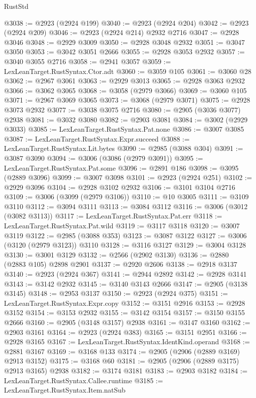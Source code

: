 \begin{lexlean}{RustStd}
\begin{coremodule}
{\begin{coremodule}
{{{{{{{{{{{{{{{{{{{{{{{{{{{{{{{{{{{{{{{{{{{{{{{{{{{{{{{{{{{{{{{{{{{{{{{{{{{{{{@3038 := @2923 (@2924 @199)
@3040 := @2923 (@2924 @204)
@3042 := @2923 (@2924 @209)
@3046 := @2923 (@2924 @214) @2932 @2716
@3047 := @2928 @3046
@3048 := @2929 @3009
@3050 := @2928 @3048 @2932
@3051 := @3047 @3050
@3053 := @3042 @3051 @2666
@3055 := @2928 @3053 @2932
@3057 := @3040 @3055 @2716
@3058 := @2941 @3057
@3059 := LexLeanTarget.RustSyntax.Ctor.adt
@3060 := @3059 @105
@3061 := @3060 @28
@3062 := @2967 @3061
@3063 := @2929 @3013
@3065 := @2928 @3063 @2932
@3066 := @3062 @3065
@3068 := @3058 (@2979 @3066)
@3069 := @3060 @105
@3071 := @2967 @3069 @3065
@3073 := @3068 (@2979 @3071)
@3075 := @2928 @3073 @2932
@3077 := @3038 @3075 @2716
@3080 := @2905 (@3036 @3077) @2938
@3081 := @3032 @3080
@3082 := @2903 @3081
@3084 := @3002 (@2929 @3033)
@3085 := LexLeanTarget.RustSyntax.Pat.none
@3086 := @3007 @3085
@3087 := LexLeanTarget.RustSyntax.Expr.succeed
@3088 := LexLeanTarget.RustSyntax.Lit.bytes
@3090 := @2985 (@3088 @304)
@3091 := @3087 @3090
@3094 := @3006 (@3086 (@2979 @3091))
@3095 := LexLeanTarget.RustSyntax.Pat.some
@3096 := @2891 @186
@3098 := @3095 (@2889 @3096)
@3099 := @3007 @3098
@3101 := @2923 (@2924 @251)
@3102 := @2929 @3096
@3104 := @2928 @3102 @2932
@3106 := @3101 @3104 @2716
@3109 := @3006 (@3099 (@2979 @3106))
@3110 := @10 @3005
@3111 := @3109 @3110
@3112 := @3094 @3111
@3113 := @3084 @3112
@3116 := @3006 (@3012 (@3082 @3113))
@3117 := LexLeanTarget.RustSyntax.Pat.err
@3118 := LexLeanTarget.RustSyntax.Pat.wild
@3119 := @3117 @3118
@3120 := @3007 @3119
@3122 := @2985 (@3088 @353)
@3123 := @3087 @3122
@3127 := @3006 (@3120 (@2979 @3123)) @3110
@3128 := @3116 @3127
@3129 := @3004 @3128
@3130 := @3001 @3129
@3132 := @2566 (@2902 @3130)
@3136 := @2880 (@2883 @105) @2898 @2901
@3137 := @2920 @2606
@3138 := @2918 @3137
@3140 := @2923 (@2924 @367)
@3141 := @2944 @2892
@3142 := @2928 @3141
@3143 := @3142 @2932
@3145 := @3140 @3143 @2666
@3147 := @2905 (@3138 @3145)
@3148 := @2953 @3137
@3150 := @2923 (@2924 @375)
@3151 := LexLeanTarget.RustSyntax.Expr.copy
@3152 := @3151 @2916
@3153 := @2928 @3152
@3154 := @3153 @2932
@3155 := @3142 @3154
@3157 := @3150 @3155 @2666
@3160 := @2905 (@3148 @3157) @2938
@3161 := @3147 @3160
@3162 := @2903 @3161
@3164 := @2923 (@2924 @383)
@3165 := @3151 @2951
@3166 := @2928 @3165
@3167 := LexLeanTarget.RustSyntax.IdentKind.operand
@3168 := @2881 @3167
@3169 := @3168 @133
@3174 := @2905 (@2906 (@2889 @3169) @2913 @3152)
@3175 := @3168 @60
@3181 := @2905 (@2906 (@2889 @3175) @2913 @3165) @2938
@3182 := @3174 @3181
@3183 := @2903 @3182
@3184 := LexLeanTarget.RustSyntax.Callee.runtime
@3185 := LexLeanTarget.RustSyntax.Item.natSub
}}}}}}}}}}}}}}}}}}}}}}}}}}}}}}}}}}}}}}}}}}}}}}}}}}}}}}}}}}}}}}}}}}}}}}}}}}}}}}
\end{coremodule}}
\end{coremodule}
\end{lexlean}

